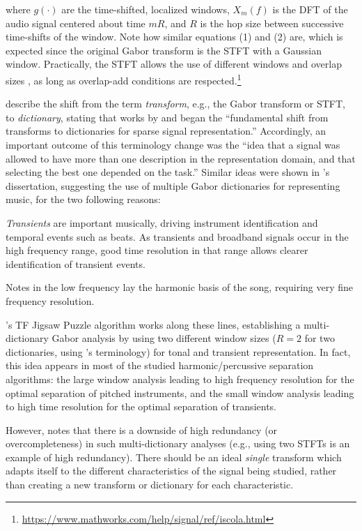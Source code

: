 \documentclass[letter,12pt]{article}
\newenvironment{tight_itemize}{
\begin{itemize}
  \setlength{\itemsep}{0pt}
  \setlength{\parskip}{0pt}
}{\end{itemize}}
\begin{document}
where $g(\cdot)$ are the time-shifted, localized windows, $X_{m}(f)$ is the DFT of the audio signal centered about time $mR$, and $R$ is the hop size between successive time-shifts of the window. Note how similar equations (1) and (2) are, which is expected since the original Gabor transform is the STFT with a Gaussian window. Practically, the STFT allows the use of different windows and overlap sizes \cite{stftinvertible}, as long as overlap-add conditions are respected.\footnote{\url{https://www.mathworks.com/help/signal/ref/iscola.html}}

\citet{dictionary} describe the shift from the term \textit{transform}, e.g., the Gabor transform or STFT, to \textit{dictionary}, stating that works by \cite{dictionary1} and \cite{dictionary2} began the ``fundamental shift from transforms to dictionaries for sparse signal representation.'' Accordingly, an important outcome of this terminology change was the ``idea that a signal was allowed to have more than one description in the representation domain, and that selecting the best one depended on the task.'' Similar ideas were shown in \citet{doerflerphd}'s dissertation, suggesting the use of multiple Gabor dictionaries for representing music, for the two following reasons:

\begin{tight_itemize}
	\item
		\textit{Transients} are important musically, driving instrument identification and temporal events such as beats. As transients and broadband signals occur in the high frequency range, good time resolution in that range allows clearer identification of transient events.
	\item
		 Notes in the low frequency lay the harmonic basis of the song, requiring very fine frequency resolution.
\end{tight_itemize}

\citet{tfjigsaw}'s TF Jigsaw Puzzle algorithm works along these lines, establishing a multi-dictionary Gabor analysis by using two different window sizes ($R = 2$ for two dictionaries, using \citet{doerflerphd}'s terminology) for tonal and transient representation. In fact, this idea appears in most of the studied harmonic/percussive separation algorithms: the large window analysis leading to high frequency resolution for the optimal separation of pitched instruments, and the small window analysis leading to high time resolution for the optimal separation of transients.

However, \citet{doerflerphd} notes that there is a downside of high redundancy (or overcompleteness) in such multi-dictionary analyses (e.g., using two STFTs is an example of high redundancy). There should be an ideal \textit{single} transform which adapts itself to the different characteristics of the signal being studied, rather than creating a new transform or dictionary for each characteristic.
\end{document}
